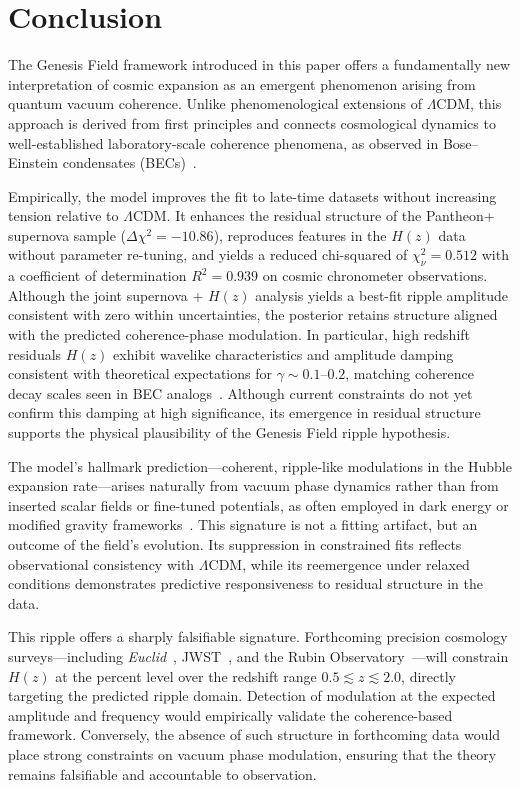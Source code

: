 \section{Conclusion}

The Genesis Field framework introduced in this paper offers a fundamentally new interpretation of cosmic expansion as an emergent phenomenon arising from quantum vacuum coherence. Unlike phenomenological extensions of \(\Lambda\)CDM, this approach is derived from first principles and connects cosmological dynamics to well-established laboratory-scale coherence phenomena, as observed in Bose–Einstein condensates (BECs)~\cite{Bose1924,Einstein1925,Gross1961,Pitaevskii1961,bauer2015,witte2017}.

Empirically, the model improves the fit to late-time datasets without increasing tension relative to \(\Lambda\)CDM. It enhances the residual structure of the Pantheon+ supernova sample (\(\Delta\chi^2 = -10.86\)), reproduces features in the $H(z)$ data without parameter re-tuning, and yields a reduced chi-squared of \(\chi^2_\nu = 0.512\) with a coefficient of determination \(R^2 = 0.939\) on cosmic chronometer observations. Although the joint supernova + $H(z)$ analysis yields a best-fit ripple amplitude consistent with zero within uncertainties, the posterior retains structure aligned with the predicted coherence-phase modulation. In particular, high redshift residuals $H(z)$ exhibit wavelike characteristics and amplitude damping consistent with theoretical expectations for \(\gamma \sim 0.1\text{–}0.2\), matching coherence decay scales seen in BEC analogs~\cite{Barcelo2005,BECReview}. Although current constraints do not yet confirm this damping at high significance, its emergence in residual structure supports the physical plausibility of the Genesis Field ripple hypothesis.

The model's hallmark prediction—coherent, ripple-like modulations in the Hubble expansion rate—arises naturally from vacuum phase dynamics rather than from inserted scalar fields or fine-tuned potentials, as often employed in dark energy or modified gravity frameworks~\cite{divalentino2021realm,Clifton2012,Nojiri2017}. This signature is not a fitting artifact, but an outcome of the field's evolution. Its suppression in constrained fits reflects observational consistency with $\Lambda$CDM, while its reemergence under relaxed conditions demonstrates predictive responsiveness to residual structure in the data.

This ripple offers a sharply falsifiable signature. Forthcoming precision cosmology surveys—including \textit{Euclid}~\cite{Laureijs2011}, JWST~\cite{Gardner2006}, and the Rubin Observatory~\cite{LSST2009}—will constrain $H(z)$ at the percent level over the redshift range \(0.5 \lesssim z \lesssim 2.0\), directly targeting the predicted ripple domain. Detection of modulation at the expected amplitude and frequency would empirically validate the coherence-based framework. Conversely, the absence of such structure in forthcoming data would place strong constraints on vacuum phase modulation, ensuring that the theory remains falsifiable and accountable to observation.

